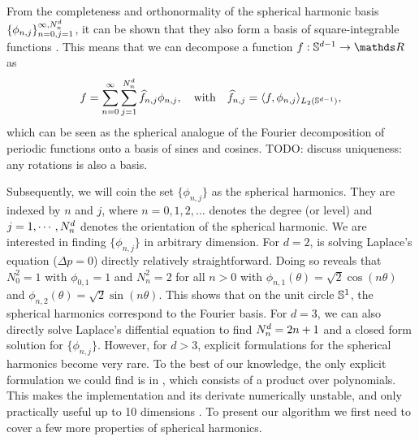 From the completeness and orthonormality of the spherical harmonic basis $\{\phi_{n,j}\}_{n=0,j=1}^{\infty,N^d_n}$, it can be shown that they also form a basis of square-integrable functions \citep{frye2014}. This means that we can decompose a function $f: \dsphere \rightarrow \Reals$ as
\begin{equation}
    f = \sum_{n=0}^{\infty} \sum_{j=1}^{N^d_n} \widehat{f}_{n, j} \phi_{n, j},\quad\text{with}\quad\widehat{f}_{n, j} = \langle f, \phi_{n, j} \rangle_{L_2(\mathbb{S}^{d-1})},
\end{equation}
which can be seen as the spherical analogue of the Fourier decomposition of periodic functions onto a basis of sines and cosines. TODO: discuss uniqueness: any rotations is also a basis.

Subsequently, we will coin the set $\{\phi_{n,j}\}$ as the spherical harmonics. They are indexed by $n$ and $j$, where $n=0,1,2,\ldots$ denotes the degree (or level) and $j=1,\cdots,N^d_n$ denotes the orientation of the spherical harmonic. We are interested in finding $\{\phi_{n,j}\}$ in arbitrary dimension. For $d=2$, is solving Laplace's equation ($\Delta p = 0$) directly relatively straightforward. Doing so reveals that $N^{2}_0 = 1$ with $\phi_{0, 1} = 1$ and $N^{2}_n = 2$ for all $n > 0$ with $\phi_{n, 1}(\theta) = \sqrt{2} \cos(n \theta)$ and $\phi_{n, 2}(\theta) = \sqrt{2} \sin(n \theta)$. This shows that on the unit circle $\mathbb{S}^1$, the spherical harmonics correspond to the Fourier basis. For $d=3$, we can also directly solve Laplace's diffential equation to find $N^d_n = 2n + 1$ and a closed form solution for $\{\phi_{n,j}\}$. However, for $d > 3$, explicit formulations for the spherical harmonics become very rare. To the best of our knowledge, the only explicit formulation we could find is in \citet[Theorem~5.1]{dai2013}, which consists of a product over polynomials. This makes the implementation and its derivate numerically unstable, and only practically useful up to 10 dimensions \citep{Dutordoir2020spherical}. To present our algorithm we first need to cover a few more properties of spherical harmonics.

